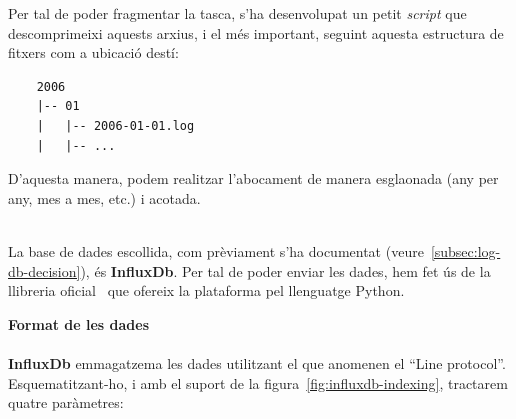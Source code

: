 \noindent
Per tal de poder fragmentar la tasca, s’ha desenvolupat un petit \textit{script} que descomprimeixi aquests arxius, i el més important, seguint aquesta estructura de fitxers com a ubicació destí:

\begin{verbatim}
    2006
    |-- 01
    |   |-- 2006-01-01.log
    |   |-- ...
\end{verbatim}
\noindent
D’aquesta manera, podem realitzar l’abocament de manera esglaonada (any per any, mes a mes, etc.) i acotada.

\noindent \\
La base de dades escollida, com prèviament s’ha documentat (veure~\ref{subsec:log-db-decision}), és \textbf{InfluxDb}.
Per tal de poder enviar les dades, hem fet ús de la llibreria oficial~\cite{influxdb:python} que ofereix la plataforma pel llenguatge Python.

\clearpage

\noindent
\textbf{Format de les dades} \\ \\
\textbf{InfluxDb} emmagatzema les dades utilitzant el que anomenen el ``Line protocol''.
Esquematitzant-ho, i amb el suport de la figura~\ref{fig:influxdb-indexing}, tractarem quatre paràmetres:

